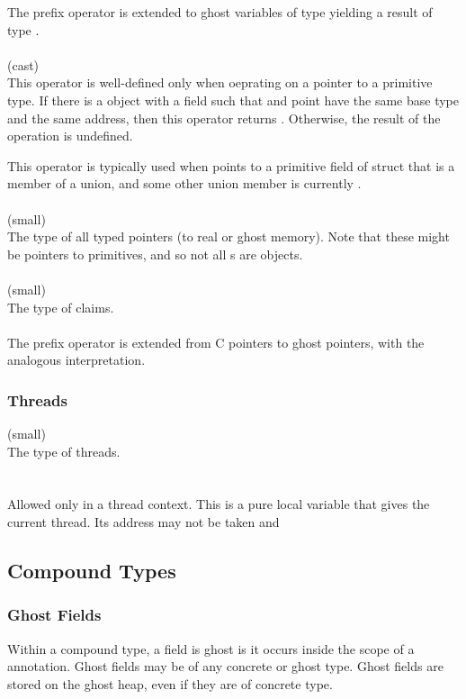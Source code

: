 \documentclass[preprint,nocopyrightspace]{sigplanconf}
\begin{document}
{The prefix \vcc{&} operator is extended to ghost variables of
type  yielding a result of type . 
\\\\
 (cast)\\
This operator is well-defined only when oeprating on a pointer  to a
primitive type. If there is a \vcc{\valid} object  with a field 
such that  and  point have the same base type and
the same address, then this operator returns . Otherwise,
the result of the operation is undefined.

This operator is typically used when  points to a primitive
field of struct that is a member of a union, and some other union
member is currently \vcc{\valid}.  
\\\\
\vcc{\object} (small)\\ 
The type of all typed pointers (to real or ghost memory). Note that
these might be pointers to primitives, and so not all \vcc{\object}s
are objects.
\\\\
\vcc{\claim} (small)\\
The type of claims. 
\\\\
The prefix \vcc{*} operator is extended from C pointers to ghost
pointers, with the analogous interpretation.

\subsubsection{Threads}
\vcc{\thread} (small) \\
The type of threads. 
\\\\
\\
Allowed only in a thread context. This is a pure local variable that
gives the current thread. Its address may not be taken and 

\subsection{Compound Types}

\subsubsection{Ghost Fields}
Within a compound type, a field is ghost is it occurs inside the scope
of a   annotation. Ghost fields may be of any concrete
or ghost type. Ghost fields are stored on the ghost heap, even if they
are of concrete type.

}
\end{document}
